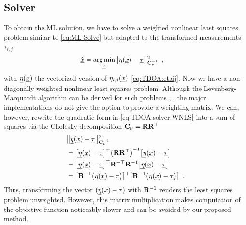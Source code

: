 \documentclass[conference]{IEEEtran}
\begin{document}
\subsection{Solver}
To obtain the \ac{ML} solution, we have to solve a weighted nonlinear least squares problem similar to \cref{eq:ML-Solve} but adapted to the transformed measurements $\tau_{i,j}$ 
\begin{align}
    \hat {{\underline{x}}} &= \operatorname*{arg\,min}_{{\underline{x}}} \mathopen{}\left\| \underline{\eta}({\underline{x}})-\underline{\tau} \right\|\mathclose{}_{{\mathbf C}_\nu^{-1}}^2 \enspace, \label{eq:TDOA:solver:WNLS}
\end{align}
with $\underline{\eta}({\underline{x}})$ the vectorized version of $\eta_{i,j}({\underline{x}})$ \cref{eq:TDOA:etaij}. 
%
%
Now we have a non-diagonally weighted nonlinear least squares problem. Although the Levenberg-Marquardt algorithm can be derived for such problems
\cite{Gavin_TheLevenbergMarquardtAlgorithmForNonlinearLeastSquaresCurveFittingProblems}, 
\cite[p.~515]{Mensing2006_PositioningAlgorithmsForCellularNetworksUsingTDOA},
the major implementations do not give the option to provide a weighting matrix. We can, however, rewrite the quadratic form in \cref{eq:TDOA:solver:WNLS} 
into a sum of squares \cite[p.~6]{Fusion19_Frisch} via the Cholesky decomposition ${\mathbf C}_\nu={\mathbf R} {\mathbf R}^\top$
\begin{align}
    &\mathopen{}\left\| \underline{\eta}({\underline{x}})-\underline{\tau} \right\|\mathclose{}_{{\mathbf C}_\nu^{-1}}^2 \\
    &= \mathopen{}\left[ {\underline{\eta}({\underline{x}})-\underline{\tau}} \right]\mathclose{}^\top {\mathopen{}\left( {\mathbf R} {\mathbf R} ^\top \right)\mathclose{}}^{-1}\mathopen{}\left[ {\underline{\eta}({\underline{x}})-\underline{\tau}} \right]\mathclose{} \label{eq:TDOA:WLS} \\
    &= \mathopen{}\left[ {\underline{\eta}({\underline{x}})-\underline{\tau}} \right]\mathclose{}^\top{\mathbf R}^{-\top}{\mathbf R}^{-1}\mathopen{}\left[ {\underline{\eta}({\underline{x}})-\underline{\tau}} \right]\mathclose{} \\
    &= \mathopen{}\left[ {\mathbf R}^{-1} \mathopen{}\left( \underline{\eta}({\underline{x}})-\underline{\tau} \right)\mathclose{} \right]\mathclose{}^\top\mathopen{}\left[ {\mathbf R}^{-1} \mathopen{}\left( \underline{\eta}({\underline{x}})-\underline{\tau} \right)\mathclose{} \right]\mathclose{} \enspace. 
\end{align}
Thus, transforming the vector $(\underline{\eta}({\underline{x}})-\underline{\tau})$ with ${\mathbf R}^{-1}$ renders the least squares problem unweighted. However, this matrix multiplication makes computation of the objective function noticeably slower and can be avoided by our proposed method. 

%
%
\end{document}
